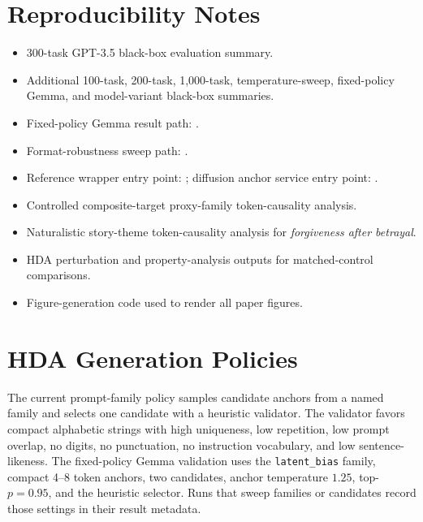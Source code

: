 \documentclass[11pt]{article}
\newcommand{\hda}{\textsc{HDA}}
\begin{document}
\section{Reproducibility Notes}

\begingroup
\small
\raggedright
\begin{itemize}
    \item 300-task GPT-3.5 black-box evaluation summary.
    \item Additional 100-task, 200-task, 1,000-task, temperature-sweep, fixed-policy Gemma, and model-variant black-box summaries.
    \item Fixed-policy Gemma result path: .
    \item Format-robustness sweep path: .
    \item Reference wrapper entry point: ; diffusion anchor service entry point: .
    \item Controlled composite-target proxy-family token-causality analysis.
    \item Naturalistic story-theme token-causality analysis for \emph{forgiveness after betrayal}.
    \item \hda{} perturbation and property-analysis outputs for matched-control comparisons.
    \item Figure-generation code used to render all paper figures.
\end{itemize}
\endgroup

\section{HDA Generation Policies}
\label{app:hda-policies}

The current prompt-family policy samples candidate anchors from a named family and selects one candidate with a heuristic validator. The validator favors compact alphabetic strings with high uniqueness, low repetition, low prompt overlap, no digits, no punctuation, no instruction vocabulary, and low sentence-likeness. The fixed-policy Gemma validation uses the \texttt{latent\_bias} family, compact 4--8 token anchors, two candidates, anchor temperature $1.25$, top-$p=0.95$, and the heuristic selector. Runs that sweep families or candidates record those settings in their result metadata.
\end{document}
